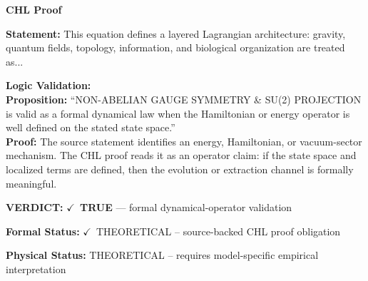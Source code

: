 \vspace{0.45em}
\noindent\textbf{CHL Proof}\par
\textbf{Statement:} This equation defines a layered Lagrangian architecture: gravity, quantum fields,
topology, information, and biological organization are treated as...

\textbf{Logic Validation:}\\
\textbf{Proposition:} ``NON-ABELIAN GAUGE SYMMETRY \& SU(2) PROJECTION is valid as a formal dynamical law when
the Hamiltonian or energy operator is well defined on the stated state space.''\\
\textbf{Proof:} The source statement identifies an energy, Hamiltonian, or vacuum-sector mechanism. The
CHL proof reads it as an operator claim: if the state space and localized terms are
defined, then the evolution or extraction channel is formally meaningful.

\textbf{VERDICT:} \ensuremath{\checkmark}\ \textbf{TRUE} --- formal dynamical-operator validation

\textbf{Formal Status:} \ensuremath{\checkmark}\ THEORETICAL -- source-backed CHL proof obligation

\textbf{Physical Status:} THEORETICAL -- requires model-specific empirical interpretation
\par\vspace{0.45em}
\par
\ifTZPDarkEdition
{}
\fi
\endgroup
\endgroup
